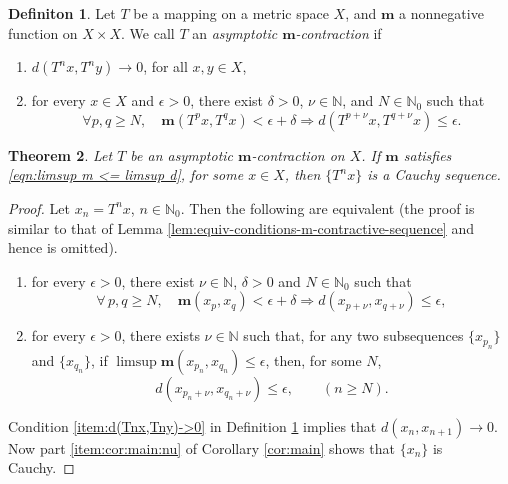 \documentclass[a4paper,10pt,twoside,reqno]{amsart}
\newtheorem{thm}{Theorem}[section]
\theoremstyle{definition}
\newtheorem{dfn}[thm]{Definiton}
\theoremstyle{remark}
\newcommand{\de}{\delta}
\newcommand{\e}{\epsilon}
\newcommand{\N}{\mathbb{N}}
\newcommand{\m}{\mathbf{m}}
\numberwithin{equation}{section}
\begin{document}
\begin{dfn}
\label{dfn:abtahi-ACF}
  Let $T$ be a mapping on a metric space $X$, and $\m$ a nonnegative function on $X\times X$.
  We call $T$ an \emph{asymptotic $\m$-contraction} if
  \begin{enumerate}[\upshape(i)]
    \item \label{item:d(Tnx,Tny)->0}
    $d(T^nx,T^ny)\to0$, for all $x,y\in X$,

    \item for every $x\in X$ and $\e>0$, there exist $\de>0$, $\nu\in\N$, and $N\in\N_0$
    such that
    \begin{equation*}
      \forall p,q\geq N, \quad
      \m(T^p x,T^q x) < \e+\de \Longrightarrow
      d(T^{p+\nu} x,T^{q+\nu} x) \leq \e.
    \end{equation*}
  \end{enumerate}
\end{dfn}

\begin{thm}
\label{thm:abtahi-AC-Cauchy}
  Let $T$ be an asymptotic $\m$-contraction on $X$. If $\m$ satisfies
  \eqref{eqn:limsup m <= limsup d}, for some $x\in X$, then $\{T^nx\}$ is a Cauchy sequence.
\end{thm}

\begin{proof}
  Let $x_n=T^nx$, $n\in\N_0$. Then the following are equivalent (the proof is similar to that of Lemma
  \ref{lem:equiv-conditions-m-contractive-sequence} and hence is omitted).
  \begin{enumerate}[\upshape(i)]
    \item for every $\e>0$, there exist $\nu\in\N$, $\de>0$ and $N\in\N_0$ such that
     \[
       \forall\, p,q \geq N,\quad
       \m(x_p,x_q) < \e+\de \Longrightarrow
       d(x_{p+\nu},x_{q+\nu}) \leq \e,
     \]

    \item for every $\e>0$, there exists $\nu\in\N$ such that,
    for any two subsequences $\{x_{p_n}\}$ and $\{x_{q_n}\}$,
    if\/ $\limsup \m(x_{p_n},x_{q_n})\leq \e$, then, for some $N$,
    \begin{equation*}
      d(x_{p_n+\nu},x_{q_n+\nu}) \leq \e, \qquad (n\geq N).
    \end{equation*}
  \end{enumerate}

  Condition \eqref{item:d(Tnx,Tny)->0} in Definition \ref{dfn:abtahi-ACF}
  implies that $d(x_n,x_{n+1})\to0$. Now part \eqref{item:cor:main:nu} of
  Corollary \ref{cor:main} shows that $\{x_n\}$ is Cauchy.
\end{proof}
\end{document}
